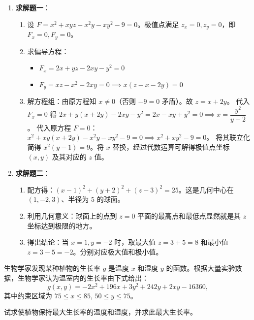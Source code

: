 \documentclass[lang=cn,11pt]{elegantbook}
\begin{document}
\begin{solution}
\begin{enumerate}
  \item \textbf{求解题一}：
  \begin{enumerate}
    \item 设 $F = x^2+xyz-x^2y-xy^2-9=0$。极值点满足 $z_x = 0, z_y = 0$，即 $F_x = 0, F_y = 0$。
    \item 求偏导方程：
    \begin{itemize}
      \item $F_x = 2x + yz - 2xy - y^2 = 0$
      \item $F_y = xz - x^2 - 2xy = 0 \implies x(z-x-2y) = 0$
    \end{itemize}
    \item 解方程组：由原方程知 $x \neq 0$（否则 $-9=0$ 矛盾）。故 $z = x+2y$。
    代入 $F_x=0$ 得 $2x+y(x+2y)-2xy-y^2 = 2x-xy+y^2=0 \implies x = \dfrac{y^2}{y-2}$。
    代入原方程 $F=0$：$x^2 + xy(x+2y) - x^2y - xy^2 - 9 = 0 \implies x^2+xy^2-9=0$。
    将其联立化简得 $x^2(y-1)=9$。将 $x$ 替换，经过代数运算可解得极值点坐标 $(x,y)$ 及其对应的 $z$ 值。
  \end{enumerate}
  
  \item \textbf{求解题二}：
  \begin{enumerate}
    \item 配方得：$(x-1)^2 + (y+2)^2 + (z-3)^2 = 25$。这是几何中心在 $(1,-2,3)$、半径为 $5$ 的球面。
    \item 利用几何意义：球面上的点到 $z=0$ 平面的最高点和最低点显然就是其 $z$ 坐标达到极限的地方。
    \item 得出结论：当 $x=1, y=-2$ 时，取最大值 $z = 3+5 = 8$ 和最小值 $z = 3-5 = -2$。分别对应极大值和极小值。
  \end{enumerate}
\end{enumerate}
\end{solution}



\begin{exercise}
生物学家发现某种植物的生长率 $g$ 是温度 $x$ 和湿度 $y$ 的函数。根据大量实验数据，生物学家认为温室内的生长率由下式给出：
\[
g(x,y)=-2x^2+196x+3y^2+242y+2xy-16360,
\]
其中约束区域为 $75\leq x\leq 85$, $50\leq y\leq 75$。

试求使植物保持最大生长率的温度和湿度，并求此最大生长率。
\end{exercise}
\end{document}
